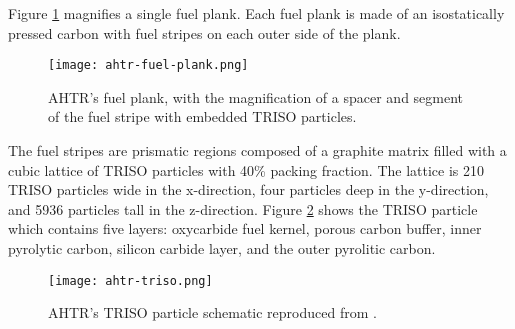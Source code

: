 Figure \ref{fig:ahtr-fuel-plank} magnifies a single fuel plank. 
Each fuel plank is made of an isostatically pressed carbon with fuel stripes 
on each outer side of the plank. 
\begin{figure}[]
    \centering
    \texttt{[image: ahtr-fuel-plank.png]} 
    \caption{\acrlong{AHTR}'s fuel plank, with the magnification of 
    a spacer and segment of the fuel stripe with embedded TRISO particles.}
    \label{fig:ahtr-fuel-plank}
\end{figure}
The fuel stripes are prismatic regions composed of a graphite matrix filled with 
a cubic lattice of \gls{TRISO} particles with 40\% packing fraction. 
The lattice is 210 \gls{TRISO} particles wide in the x-direction, four particles 
deep in the y-direction, and 5936 particles tall in the z-direction. 
Figure \ref{fig:ahtr-triso} shows the \gls{TRISO} particle which contains five 
layers: oxycarbide fuel kernel, porous carbon buffer, inner pyrolytic carbon, 
silicon carbide layer, and the outer pyrolitic carbon. 
\begin{figure}[]
    \centering
    \texttt{[image: ahtr-triso.png]} 
    \caption{\acrlong{AHTR}'s TRISO particle schematic reproduced from 
    \cite{noauthor_fluoride_nodate}.}
    \label{fig:ahtr-triso}
\end{figure}

